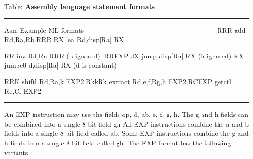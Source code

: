 \documentclass[11pt]{article}
\begin{document}
Table: \textbf{\textbf{Assembly language statement formats}}

\noindent\rule{\textwidth}{0.5pt}
 Asm   Example                  ML formats
------- ---------------------  ---------------------------
 RRR     add     Rd,Ra,Rb       RRR
 RX      lea     Rd,disp[Ra]    RX

RR      inv     Rd,Ra          RRR (b ignored), RREXP
JX      jump    disp[Ra]       RX (b ignored)
KX      jumpc0  d,disp[Ra]     RX (d is constant)

RRK     shiftl  Rd,Ra,k        EXP2
RkkRk   extract Rd,e,f,Rg,h    EXP2
RCEXP   getctl  Re,Cf          EXP2

\noindent\rule{\textwidth}{0.5pt}

An EXP instruction may use the fields op, d, ab, e, f, g, h.  The g
and h fields can be combined into a single 8-bit field gh All EXP
instructions combine the a and b fields into a single 8-bit field
called ab.  Some EXP instructions combine the g and h fields into a
single 8-bit field called gh.  The EXP format has the following
variants.
\end{document}
